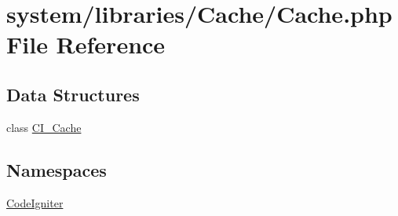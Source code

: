 \hypertarget{_cache_8php}{\section{system/libraries/\-Cache/\-Cache.php File Reference}
\label{_cache_8php}
}
\subsection*{Data Structures}
\begin{DoxyCompactItemize}
\item 
class \hyperlink{class_c_i___cache}{C\-I\-\_\-\-Cache}
\end{DoxyCompactItemize}
\subsection*{Namespaces}
\begin{DoxyCompactItemize}
\item 
\hyperlink{namespace_code_igniter}{Code\-Igniter}
\end{DoxyCompactItemize}
